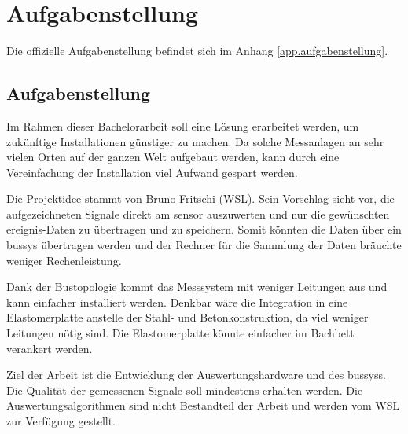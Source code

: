 %
%

\chapter{Aufgabenstellung}\label{chap.aufgabenstellung}

Die offizielle Aufgabenstellung befindet sich im Anhang \ref{app.aufgabenstellung}.

\section{Aufgabenstellung}\label{sec.aufgabenstellung}
Im Rahmen dieser Bachelorarbeit soll eine Lösung erarbeitet werden, um zukünftige Installationen günstiger zu machen. Da solche Messanlagen an sehr vielen Orten auf der ganzen Welt aufgebaut werden, kann durch eine Vereinfachung der Installation viel Aufwand gespart werden. 

Die Projektidee stammt von Bruno Fritschi (WSL). Sein Vorschlag sieht vor, die aufgezeichneten Signale direkt am \gls{sensor} auszuwerten und nur die gewünschten \gls{ereignis}-Daten zu übertragen und zu speichern. Somit könnten die Daten über ein \gls{bussys} übertragen werden und der Rechner für die Sammlung der Daten bräuchte weniger Rechenleistung.

Dank der Bustopologie kommt das Messsystem mit weniger Leitungen aus und kann einfacher installiert werden. Denkbar wäre die Integration in eine Elastomerplatte anstelle der Stahl- und Betonkonstruktion, da viel weniger Leitungen nötig sind. Die Elastomerplatte könnte einfacher im Bachbett verankert werden.

Ziel der Arbeit ist die Entwicklung der Auswertungshardware und des \gls{bussys}s. Die Qualität der gemessenen Signale soll mindestens erhalten werden. Die Auswertungsalgorithmen sind nicht Bestandteil der Arbeit und werden vom WSL zur Verfügung gestellt.

